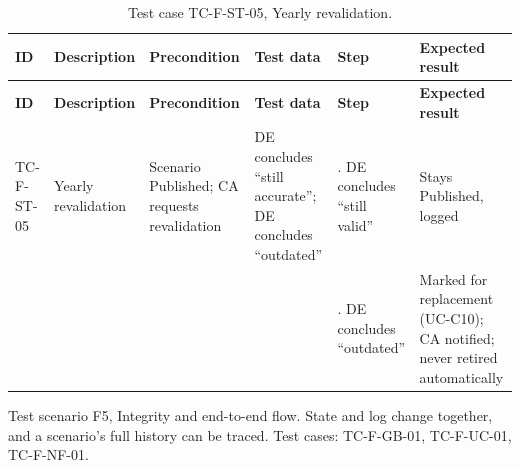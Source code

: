 {\footnotesize{}\renewcommand{\arraystretch}{1.1}
\begin{longtable}{|>{\raggedright\arraybackslash}p{}|>{\raggedright\arraybackslash}p{}|>{\raggedright\arraybackslash}p{}|>{\raggedright\arraybackslash}p{}|>{\raggedright\arraybackslash}p{}|>{\raggedright\arraybackslash}p{}|}
\caption{Test case TC-F-ST-05, Yearly revalidation.} \\
\hline
\textbf{ID} & \textbf{Description} & \textbf{Precondition} & \textbf{Test data} & \textbf{Step} & \textbf{Expected result} \\ \hline
\endfirsthead
\hline
\textbf{ID} & \textbf{Description} & \textbf{Precondition} & \textbf{Test data} & \textbf{Step} & \textbf{Expected result} \\ \hline
\endhead
TC-F-ST-05 & Yearly revalidation & Scenario Published; CA requests revalidation & DE concludes ``still accurate''; DE concludes ``outdated'' & 1. DE concludes ``still valid'' & Stays Published, logged \\ \cline{5-6}
 &  &  &  & 2. DE concludes ``outdated'' & Marked for replacement (UC-C10); CA notified; never retired automatically \\ \hline
\end{longtable}
}

Test scenario F5, Integrity and end-to-end flow. State and log change together, and a scenario's full history can be traced. Test cases: TC-F-GB-01, TC-F-UC-01, TC-F-NF-01.

